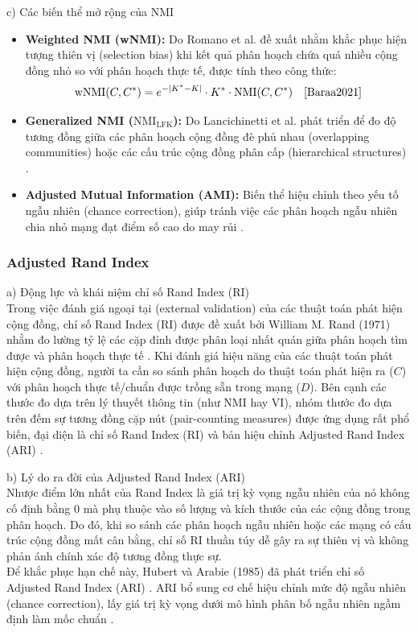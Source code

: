 \documentclass[14pt,a4paper]{extarticle}
\begin{document}
\noindent c) Các biến thể mở rộng của NMI
\begin{itemize}
    \item \textbf{Weighted NMI (wNMI):} Do Romano et al. đề xuất nhằm khắc phục hiện tượng thiên vị (selection bias) khi kết quả phân hoạch chứa quá nhiều cộng đồng nhỏ so với phân hoạch thực tế, được tính theo công thức:
    \[
    \text{wNMI}(C, C^*) = e^{-|K^* - K|} \cdot K^* \cdot \text{NMI}(C, C^*) \quad \text{\cite{Baraa2021}}
    \]
    \item \textbf{Generalized NMI ($\text{NMI}_{\text{LFK}}$):} Do Lancichinetti et al. phát triển để đo độ tương đồng giữa các phân hoạch cộng đồng đè phủ nhau (overlapping communities) hoặc các cấu trúc cộng đồng phân cấp (hierarchical structures) \cite{Fortunato2010}.
    \item \textbf{Adjusted Mutual Information (AMI):} Biến thể hiệu chỉnh theo yếu tố ngẫu nhiên (chance correction), giúp tránh việc các phân hoạch ngẫu nhiên chia nhỏ mạng đạt điểm số cao do may rủi \cite{Dao2020}.
\end{itemize}

\subsubsection{Adjusted Rand Index}

\noindent a) Động lực và khái niệm chỉ số Rand Index (RI)
\\ \indent
Trong việc đánh giá ngoại tại (external validation) của các thuật toán phát hiện cộng đồng, chỉ số Rand Index (RI) được đề xuất bởi William M. Rand (1971) nhằm đo lường tỷ lệ các cặp đỉnh được phân loại nhất quán giữa phân hoạch tìm được và phân hoạch thực tế \cite{Beldi2025, Dao2020}. Khi đánh giá hiệu năng của các thuật toán phát hiện cộng đồng, người ta cần so sánh phân hoạch do thuật toán phát hiện ra ($C$) với phân hoạch thực tế/chuẩn được trồng sẵn trong mạng ($D$). Bên cạnh các thước đo dựa trên lý thuyết thông tin (như NMI hay VI), nhóm thước đo dựa trên đếm sự tương đồng cặp nút (pair-counting measures) được ứng dụng rất phổ biến, đại diện là chỉ số Rand Index (RI) và bản hiệu chỉnh Adjusted Rand Index (ARI) \cite{Traag2014}.

\noindent b) Lý do ra đời của Adjusted Rand Index (ARI)
\\ \indent
Nhược điểm lớn nhất của Rand Index là giá trị kỳ vọng ngẫu nhiên của nó không cố định bằng $0$ mà phụ thuộc vào số lượng và kích thước của các cộng đồng trong phân hoạch. Do đó, khi so sánh các phân hoạch ngẫu nhiên hoặc các mạng có cấu trúc cộng đồng mất cân bằng, chỉ số RI thuần túy dễ gây ra sự thiên vị và không phản ánh chính xác độ tương đồng thực sự.
\\ \indent
Để khắc phục hạn chế này, Hubert và Arabie (1985) đã phát triển chỉ số Adjusted Rand Index (ARI) \cite{Beldi2025, Dao2020}. ARI bổ sung cơ chế hiệu chỉnh mức độ ngẫu nhiên (chance correction), lấy giá trị kỳ vọng dưới mô hình phân bố ngẫu nhiên ngầm định làm mốc chuẩn \cite{Dao2020}.
\end{document}
